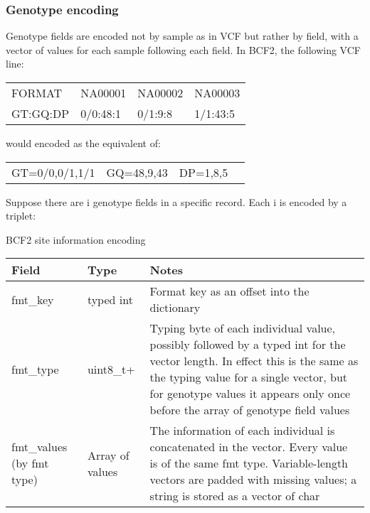\documentclass[8pt]{article}
\begin{document}
\subsubsection{Genotype encoding}
\label{GenotypeEncoding}

Genotype fields are encoded not by sample as in VCF but rather by field, with a vector of values for each sample following each field.  In BCF2, the following VCF line:

\vspace{0.3cm}
\begin{tabular}{l l l l}
FORMAT & NA00001 & NA00002 & NA00003 \\
GT:GQ:DP & 0/0:48:1 & 0/1:9:8 & 1/1:43:5 \\
\end{tabular}
\vspace{0.3cm}

would encoded as the equivalent of:

\vspace{0.3cm}
\begin{tabular}{l l l l}
GT=0/0,0/1,1/1 & GQ=48,9,43 & DP=1,8,5
\end{tabular}
\vspace{0.3cm}

Suppose there are i genotype fields in a specific record.  Each i is encoded by a triplet:

BCF2 site information encoding

\vspace{0.3cm}
\small
\begin{tabular}{ | p{2cm} | p{2.5cm} | p{9.5cm} | } \hline
Field & Type & Notes \\ \hline
fmt\_key & typed int & Format key as an offset into the dictionary \\ \hline
fmt\_type & uint8\_t+ & Typing byte of each individual value, possibly followed by a typed int for the vector length.  In effect this is the same as the typing value for a single vector, but for genotype values it appears only once before the array of genotype field values \\ \hline
fmt\_values	(by fmt type) & Array of values & The information of each individual is concatenated in the vector.  Every value is of the same fmt type.  Variable-length vectors are padded with missing values; a string is stored as a vector of char \\  \hline
\end{tabular}
\normalsize
\vspace{0.3cm}
\end{document}
